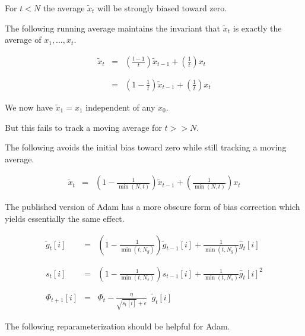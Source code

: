 {\vfill
For $t < N$ the average $\tilde{x}_t$ will be strongly biased toward zero.


The following running average maintains the invariant that $\tilde{x}_t$ is exactly the average of $x_1,\ldots,x_t$.

\begin{eqnarray*}
\tilde{x}_t & = & \left(\frac{t-1}{t}\right)\tilde{x}_{t-1} + \left(\frac{1}{t}\right)x_t \\
\\
\\
& = & \left(1-\frac{1}{t}\right)\tilde{x}_{t-1} + \left(\frac{1}{t}\right)x_t
\end{eqnarray*}

\vfill
We now have $\tilde{x}_1 = x_1$ independent of any $x_0$.

\vfill
But this fails to track a moving average for $t >> N$.


The following avoids the initial bias toward zero while still tracking a moving average.

\begin{eqnarray*}
\tilde{x}_t & = & \left(1-\frac{1}{\min(N,t)}\right)\tilde{x}_{t-1} + \left(\frac{1}{\min(N,t)}\right)x_t
\end{eqnarray*}

\vfill
The published version of Adam has a more obscure form of bias correction which yields essentially the same effect.


\begin{eqnarray*}
  \tilde{g}_{t}[i] & = & \left(1-\frac{1}{\min(t,N_g)}\right)\tilde{g}_{t-1}[i] + \frac{1}{\min(t,N_g)} \hat{g}_t[i] \\
  \\
  \\
  s_{t}[i] & = & \left(1-\frac{1}{\min(t,N_s)}\right)s_{t-1}[i] + \frac{1}{\min(t,N_s)} \hat{g}_t[i]^2 \\
  \\
  \\
\Phi_{t+1}[i] & =  & \Phi_t - \frac{\eta}{\sqrt{s_{t}[i]} + \epsilon}\;\;\tilde{g}_{t}[i]
\end{eqnarray*}


The following reparameterization should be helpful for Adam.

}
